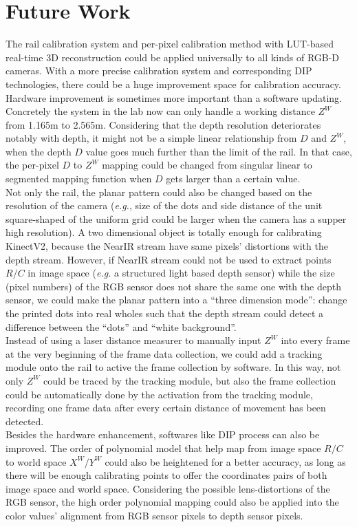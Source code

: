 \section{Future Work}
%
The rail calibration system and per-pixel calibration method with LUT-based real-time 3D reconstruction could be applied universally to all kinds of RGB-D cameras. With a more precise calibration system and corresponding DIP technologies, there could be a huge improvement space for calibration accuracy. Hardware improvement is sometimes more important than a software updating. Concretely the system in the lab now can only handle a working distance \(Z^W\) from 1.165m to 2.565m. Considering that the depth resolution deteriorates notably with depth, it might not be a simple linear relationship from \(D\) and \(Z^W\), when the depth \(D\) value goes much further than the limit of the rail. In that case, the per-pixel \(D\) to \(Z^W\) mapping could be changed from singular linear to segmented mapping function when \(D\) gets larger than a certain value.
\\\indent
Not only the rail, the planar pattern could also be changed based on the resolution of the camera (\textit{e.g.}, size of the dots and side distance of the unit square-shaped of the uniform grid could be larger when the camera has a supper high resolution). A two dimensional object is totally enough for calibrating KinectV2, because the NearIR stream have same pixels' distortions with the depth stream. However, if NearIR stream could not be used to extract points \(R/C\) in image space (\textit{e.g.} a structured light based depth sensor) while the size (pixel numbers) of the RGB sensor does not share the same one with the depth sensor, we could make the planar pattern into a \enquote{three dimension mode}: change the printed dots into real wholes such that the depth stream could detect a difference between the \enquote{dots} and \enquote{white background}. 
\\\indent
Instead of using a laser distance measurer to manually input \(Z^W\) into every frame at the very beginning of the frame data collection, we could add a tracking module onto the rail to active the frame collection by software. In this way, not only \(Z^W\) could be traced by the tracking module, but also the frame collection could be automatically done by the activation from the tracking module, recording one frame data after every certain distance of movement has been detected. 
\\\indent
Besides the hardware enhancement, softwares like DIP process can also be improved. The order of polynomial model that help map from image space \(R/C\) to world space \(X^W/Y^W\) could also be heightened for a better accuracy, as long as there will be enough calibrating points to offer the coordinates pairs of both image space and world space. Considering the possible lens-distortions of the RGB sensor, the high order polynomial mapping could also be applied into the color values' alignment from RGB sensor pixels to depth sensor pixels.
